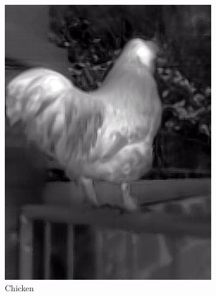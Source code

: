 \documentclass{l4proj}
\begin{document}
\begin{figure}[ht]
\begin{subfigure}[h!]{0.18\textwidth}
    \includegraphics[width=\textwidth, trim={0cm 2.5cm 0cm 2.5cm}, clip]{images/dataset/chicken/lwir.png}
    \caption{Chicken}
  \end{subfigure}
  \begin{subfigure}[h!]{0.18\textwidth}

\end{subfigure}
\end{figure}
\end{document}
